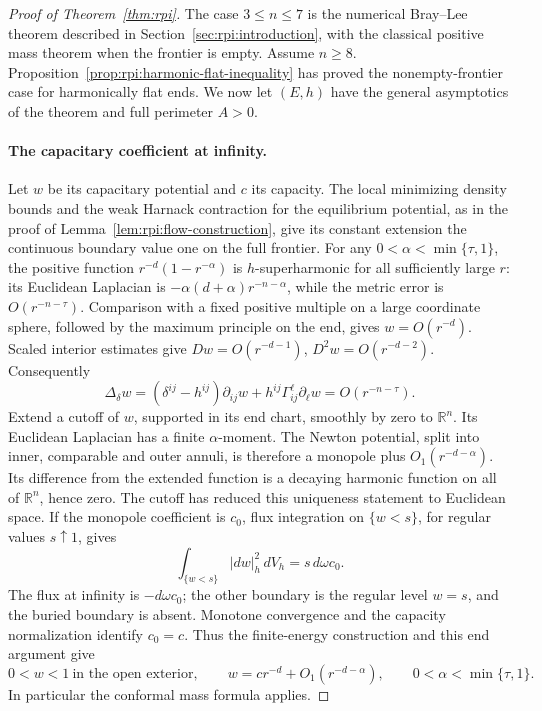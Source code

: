 \begin{proof}[Proof of Theorem~\ref{thm:rpi}]
The case $3\le n\le7$ is the numerical Bray--Lee theorem described
in Section~\ref{sec:rpi:introduction}, with the classical positive
mass theorem when the frontier is empty. Assume $n\ge8$.
Proposition~\ref{prop:rpi:harmonic-flat-inequality} has proved the
nonempty-frontier case for harmonically flat ends. We now let $(E,h)$
have the general asymptotics of the theorem and full perimeter $A>0$.

\paragraph{The capacitary coefficient at infinity.}
Let \(w\) be its capacitary potential and \(c\) its capacity.
The local minimizing density bounds and the weak Harnack contraction
for the equilibrium potential, as in the proof of
Lemma~\ref{lem:rpi:flow-construction}, give its constant extension
the continuous boundary value one on the full frontier.
For any \(0<\alpha<\min\{\tau,1\}\), the positive
function \(r^{-d}(1-r^{-\alpha})\) is \(h\)-superharmonic for all
sufficiently large \(r\): its Euclidean Laplacian is
\(-\alpha(d+\alpha)r^{-n-\alpha}\), while the metric error is
\(O(r^{-n-\tau})\). Comparison with a fixed positive multiple on a
large coordinate sphere, followed by the maximum principle on the
end, gives \(w=O(r^{-d})\). Scaled interior estimates give
\(Dw=O(r^{-d-1})\), \(D^2w=O(r^{-d-2})\). Consequently
\[
 \Delta_\delta w
  =(\delta^{ij}-h^{ij})\partial_{ij}w
      +h^{ij}\Gamma_{ij}^\ell\partial_\ell w
  =O(r^{-n-\tau}).
\]
Extend a cutoff of \(w\), supported in its end chart, smoothly by zero
to \(\mathbb R^n\). Its Euclidean Laplacian has a finite
\(\alpha\)-moment. The Newton potential, split into inner, comparable
and outer annuli, is therefore a monopole plus
\(O_1(r^{-d-\alpha})\). Its difference from the extended function is
a decaying harmonic function on all of \(\mathbb R^n\), hence zero.
The cutoff has reduced this uniqueness statement to Euclidean space.
If the monopole coefficient is \(c_0\), flux integration on
\(\{w<s\}\), for regular values \(s\uparrow1\), gives
\[
 \int_{\{w<s\}}|dw|_h^2\,dV_h=s\,d\omega c_0.
\]
The flux at infinity is \(-d\omega c_0\); the other boundary is the
regular level \(w=s\), and the buried boundary is absent. Monotone
convergence and the capacity normalization identify \(c_0=c\).
Thus the finite-energy construction and this end argument give
\[
 0<w<1\ \text{in the open exterior},\qquad
 w=c r^{-d}+O_1(r^{-d-\alpha}),\qquad
 0<\alpha<\min\{\tau,1\}.
\]
In particular the conformal mass formula applies.


\end{proof}
